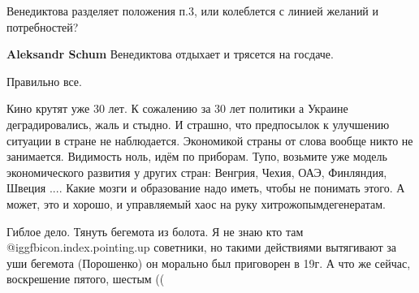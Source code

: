 \begin{itemize}
Венедиктова разделяет положения п.3, или колеблется с линией желаний и потребностей?

\textbf{Aleksandr Schum} Венедиктова отдыхает и трясется на госдаче.

Правильно все.


Кино крутят уже 30 лет. К сожалению за 30 лет политики а Украине
деградировались, жаль и стыдно. И страшно, что предпосылок к улучшению ситуации
в стране не наблюдается. Экономикой страны от слова вообще никто не занимается.
Видимость ноль, идём по приборам. Тупо, возьмите уже модель экономического
развития у других стран: Венгрия, Чехия, ОАЭ, Финляндия, Швеция .... Какие
мозги и образование надо иметь, чтобы не понимать этого. А может, это и хорошо,
и управляемый хаос на руку хитрожопымдегенератам.


Гиблое дело. Тянуть бегемота из болота. Я не знаю кто там
@igg{fbicon.index.pointing.up} ️советники, но такими действиями вытягивают за
уши бегемота (Порошенко) он морально был приговорен в 19г. А что же сейчас,
воскрешение пятого, шестым ((


\end{itemize} %
